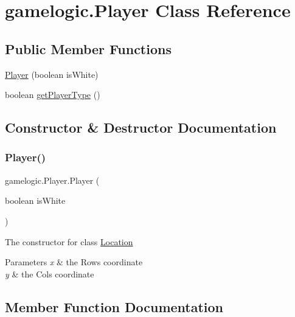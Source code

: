 \hypertarget{classgamelogic_1_1_player}{}\section{gamelogic.\+Player Class Reference}
\label{classgamelogic_1_1_player}
\subsection*{Public Member Functions}
\begin{DoxyCompactItemize}
\item 
\mbox{\hyperlink{classgamelogic_1_1_player_a1d7ca97131c5bf8912b05aa9475e493f}{Player}} (boolean is\+White)
\item 
boolean \mbox{\hyperlink{classgamelogic_1_1_player_a043caf992b13d5b287c98b0f668b4647}{get\+Player\+Type}} ()
\end{DoxyCompactItemize}


\subsection{Constructor \& Destructor Documentation}
\mbox{\label{classgamelogic_1_1_player_a1d7ca97131c5bf8912b05aa9475e493f}} 
\subsubsection{\texorpdfstring{Player()}{Player()}}
{\footnotesize\ttfamily gamelogic.\+Player.\+Player (\begin{DoxyParamCaption}\item[{boolean}]{is\+White }\end{DoxyParamCaption})}

The constructor for class \mbox{\hyperlink{classgamelogic_1_1_location}{Location}} 
\begin{DoxyParams}{Parameters}
{\em x} & the Row\textquotesingle{}s coordinate \\
\hline
{\em y} & the Col\textquotesingle{}s coordinate \\
\hline
\end{DoxyParams}


\subsection{Member Function Documentation}
\mbox{\label{classgamelogic_1_1_player_a043caf992b13d5b287c98b0f668b4647}} 
